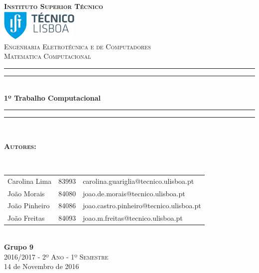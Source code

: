 \documentclass[18pt]{article}
\begin{document}
\begin{titlepage}

\thispagestyle{empty}
\newcommand{\HRule}{\rule{\linewidth}{0.5mm}} %
\center
\textsc{\bfseries\LARGE Instituto Superior Técnico}\\[1cm] %
\includegraphics[height=1.5cm]{IST_Logo.pdf}\\[2.5cm]
\textsc{\Large Engenharia Eletrotécnica e de Computadores}\\[0.5cm] %
\textsc{\large Matematica Computacional }\\[0.5cm] %

\rule{\textwidth}{1.6pt}\vspace*{-\baselineskip}\vspace*{2pt} %
\rule{\textwidth}{0.4pt}\\[\baselineskip] %

{\Huge \bfseries 1º Trabalho Computacional}\\[0.2cm]

\rule{\textwidth}{0.4pt}\vspace*{-\baselineskip}\vspace{3.2pt} %
\rule{\textwidth}{1.6pt}\\[1.5cm]


\begin{minipage}{0.9\textwidth}
	\begin{flushleft} \large
		\begin{Large}\bfseries\textsc{Autores:}\end{Large}\\[0.4cm]
		\begin{tabular}{l l l}

			Carolina Lima & 83993 & \normalsize carolina.guariglia@tecnico.ulisboa.pt \\
			João Morais   & 84080 & \normalsize	joao.de.morais@tecnico.ulisboa.pt \\
			João Pinheiro & 84086 & \normalsize joao.castro.pinheiro@tecnico.ulisboa.pt \\
			João Freitas  & 84093 & \normalsize joao.m.freitas@tecnico.ulisboa.pt \\

		\end{tabular}
	\end{flushleft}
\end{minipage}\\[0.5cm]


{\bfseries Grupo 9}\\[1cm]
\large\textsc{ 2016/2017 - 2º Ano - 1º Semestre}\\
\large 14 de Novembro de 2016\\[1cm]


\end{titlepage}
\end{document}
